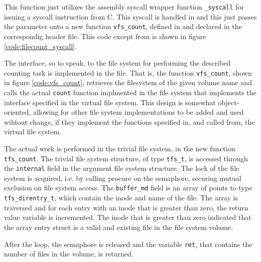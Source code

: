 
This function just utilizes the assembly syscall wrapper function
\verb|_syscall| for issuing a syscall instruction from C. This syscall is
handled in  and this just passes the parameter onto a new
function \verb|vfs_count|, defined in  and declared in the
correspondig header file. This code except from  is shown
in figure \ref{code:filecount_syscall}.


The interface, so to speak, to the file system for performing the described
counting task is implemented in the  file. That is, the function
\verb|vfs_count|, shown in figure \ref{code:vfs_count}, retrieves the
filesystem of the given volume name and calls the actual \verb|count| function
implmented in the file system that implements the interface specified in the
virtual file system. This design is somewhat object-oriented, allowing for
other file system implementations to be added and used wihtout change, if they
implement the functions specified in, and called from, the virtual file system.


The actual work is performed in the trivial file system, in the new function
\verb|tfs_count|. The trivial file system structure, of type \verb|tfs_t|, is
accessed through the \verb|internal| field in the argument file system
structure. The lock of the file system is acquired, i.e. by calling procure on
the semaphore, securing mutual exclusion on file system access. The
\verb|buffer_md| field is an array of points to type \verb|tfs_direntry_t|,
which contain the inode and name of the file. The array is traversed and for
each entry with an inode that is greater than zero, the return value variable
is incremented. The inode that is greater than zero indicated that the array
entry struct is a valid and existing file in the file system volume.


After the loop, the semaphore is released and the variable \verb|ret|, that
contains the number of files in the volume, is returned.


